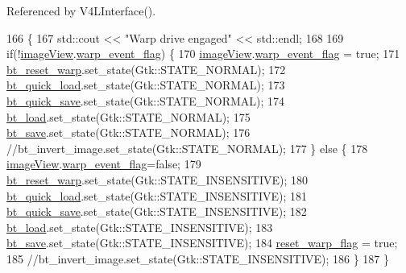 Referenced by V4\+L\+Interface().


\begin{DoxyCode}
166                                                \{
167         std::cout << \textcolor{stringliteral}{"Warp drive engaged"} << std::endl;
168 
169         \textcolor{keywordflow}{if}(!\hyperlink{class_v_s_s_s___g_u_i_1_1_v4_l_interface_a2c99f4d9fad8a34fa98d5b61beb06745}{imageView}.\hyperlink{class_image_view_a1a2a3e02d28b64343e62e17069fb1fd8}{warp\_event\_flag}) \{
170             \hyperlink{class_v_s_s_s___g_u_i_1_1_v4_l_interface_a2c99f4d9fad8a34fa98d5b61beb06745}{imageView}.\hyperlink{class_image_view_a1a2a3e02d28b64343e62e17069fb1fd8}{warp\_event\_flag} = \textcolor{keyword}{true};
171             \hyperlink{class_v_s_s_s___g_u_i_1_1_v4_l_interface_af7e670a295f186a699859a285ea1cdbb}{bt\_reset\_warp}.set\_state(Gtk::STATE\_NORMAL);
172             \hyperlink{class_v_s_s_s___g_u_i_1_1_v4_l_interface_a7b72e731fab1a75270726fcd3936521e}{bt\_quick\_load}.set\_state(Gtk::STATE\_NORMAL);
173             \hyperlink{class_v_s_s_s___g_u_i_1_1_v4_l_interface_a424118f056f71fba97d881f4647f7555}{bt\_quick\_save}.set\_state(Gtk::STATE\_NORMAL);
174             \hyperlink{class_v_s_s_s___g_u_i_1_1_v4_l_interface_a4c726d738e66bc77323a038918d133ce}{bt\_load}.set\_state(Gtk::STATE\_NORMAL);
175             \hyperlink{class_v_s_s_s___g_u_i_1_1_v4_l_interface_a961db9f4decd0e940ebd69fbb0cccc61}{bt\_save}.set\_state(Gtk::STATE\_NORMAL);
176             \textcolor{comment}{//bt\_invert\_image.set\_state(Gtk::STATE\_NORMAL);}
177         \} \textcolor{keywordflow}{else} \{
178             \hyperlink{class_v_s_s_s___g_u_i_1_1_v4_l_interface_a2c99f4d9fad8a34fa98d5b61beb06745}{imageView}.\hyperlink{class_image_view_a1a2a3e02d28b64343e62e17069fb1fd8}{warp\_event\_flag}=\textcolor{keyword}{false};
179             \hyperlink{class_v_s_s_s___g_u_i_1_1_v4_l_interface_af7e670a295f186a699859a285ea1cdbb}{bt\_reset\_warp}.set\_state(Gtk::STATE\_INSENSITIVE);
180             \hyperlink{class_v_s_s_s___g_u_i_1_1_v4_l_interface_a7b72e731fab1a75270726fcd3936521e}{bt\_quick\_load}.set\_state(Gtk::STATE\_INSENSITIVE);
181             \hyperlink{class_v_s_s_s___g_u_i_1_1_v4_l_interface_a424118f056f71fba97d881f4647f7555}{bt\_quick\_save}.set\_state(Gtk::STATE\_INSENSITIVE);
182             \hyperlink{class_v_s_s_s___g_u_i_1_1_v4_l_interface_a4c726d738e66bc77323a038918d133ce}{bt\_load}.set\_state(Gtk::STATE\_INSENSITIVE);
183             \hyperlink{class_v_s_s_s___g_u_i_1_1_v4_l_interface_a961db9f4decd0e940ebd69fbb0cccc61}{bt\_save}.set\_state(Gtk::STATE\_INSENSITIVE);
184                 \hyperlink{class_v_s_s_s___g_u_i_1_1_v4_l_interface_aa6cd5079d1f62050205bca10edf667ce}{reset\_warp\_flag} = \textcolor{keyword}{true};
185             \textcolor{comment}{//bt\_invert\_image.set\_state(Gtk::STATE\_INSENSITIVE);}
186         \}
187     \}
\end{DoxyCode}
